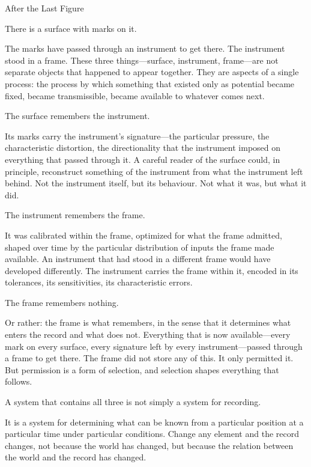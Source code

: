 
\begin{interlude}{After the Last Figure}

There is a surface with marks on it.

The marks have passed through an instrument to get there. The
instrument stood in a frame. These three things---surface,
instrument, frame---are not separate objects that happened to
appear together. They are aspects of a single process: the process
by which something that existed only as potential became fixed,
became transmissible, became available to whatever comes next.

The surface remembers the instrument.

Its marks carry the instrument's signature---the particular
pressure, the characteristic distortion, the directionality that
the instrument imposed on everything that passed through it. A
careful reader of the surface could, in principle, reconstruct
something of the instrument from what the instrument left behind.
Not the instrument itself, but its behaviour. Not what it was,
but what it did.

The instrument remembers the frame.

It was calibrated within the frame, optimized for what the frame
admitted, shaped over time by the particular distribution of
inputs the frame made available. An instrument that had stood in
a different frame would have developed differently. The instrument
carries the frame within it, encoded in its tolerances, its
sensitivities, its characteristic errors.

The frame remembers nothing.

Or rather: the frame is what remembers, in the sense that it
determines what enters the record and what does not. Everything
that is now available---every mark on every surface, every
signature left by every instrument---passed through a frame to
get there. The frame did not store any of this. It only permitted
it. But permission is a form of selection, and selection shapes
everything that follows.

\medskip

A system that contains all three is not simply a system for
recording.

It is a system for determining what can be known from a particular
position at a particular time under particular conditions. Change
any element and the record changes, not because the world has
changed, but because the relation between the world and the record
has changed.


\end{interlude}
